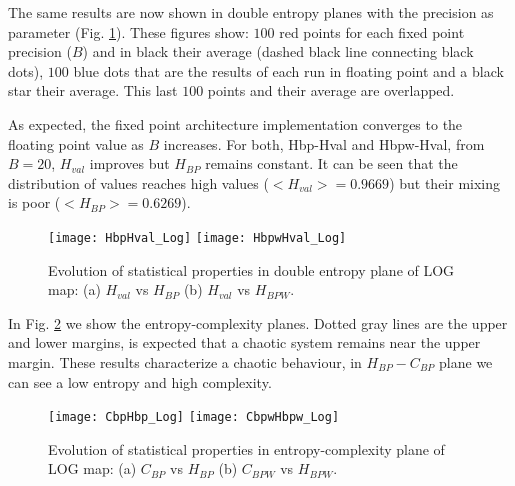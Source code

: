 The same results are now shown in double entropy planes with the precision as parameter (Fig. \ref{fig:LOG_HH}).
These figures show: $100$ red points for each fixed point precision ($B$) and in black their average (dashed black line connecting black dots), $100$ blue dots that are the results of each run in floating point and a black star their average.
This last $100$ points and their average are overlapped.

As expected, the fixed point architecture implementation converges to the floating point value as $B$ increases.
For both, Hbp-Hval and Hbpw-Hval, from $B=20$, $H_{val}$ improves but $H_{BP}$ remains constant.
It can be seen that the distribution of values reaches high values ($<H_{val}>=0.9669$) but their mixing is poor ($<H_{BP}>=0.6269$).

\begin{figure}
	\texttt{[image: HbpHval\_Log]}
	\texttt{[image: HbpwHval\_Log]}
	\caption{Evolution of statistical properties in double entropy plane of LOG map: (a) $H_{val}$ vs $H_{BP}$ (b) $H_{val}$ vs $H_{BPW}$.}
	\label{fig:LOG_HH}
\end{figure}

In Fig. \ref{fig:LOG_HC} we show the entropy-complexity planes.
Dotted gray lines are the upper and lower margins, is expected that a chaotic system remains near the upper margin.
These results characterize a chaotic behaviour, in $H_{BP}-C_{BP}$ plane we can see a low entropy and high complexity.

\begin{figure}
	\texttt{[image: CbpHbp\_Log]}
	\texttt{[image: CbpwHbpw\_Log]}
	\caption{Evolution of statistical properties in entropy-complexity plane of LOG map: (a) $C_{BP}$ vs $H_{BP}$ (b) $C_{BPW}$ vs $H_{BPW}$.}
	\label{fig:LOG_HC}
\end{figure}
